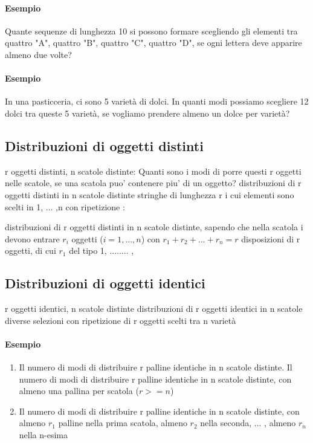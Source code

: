 \paragraph{Esempio} %
Quante sequenze di lunghezza 10 si possono formare scegliendo gli elementi tra
quattro "A",
quattro "B",
quattro "C",
quattro "D",
se ogni lettera deve apparire almeno due volte?

\paragraph{Esempio} %
In una pasticceria, ci sono 5 varietà di dolci. In quanti modi possiamo scegliere 12
dolci tra queste 5 varietà, se vogliamo prendere almeno un dolce per varietà?

\subsection{Distribuzioni di oggetti distinti} 
r oggetti distinti, n scatole distinte: Quanti sono i modi di porre questi r oggetti nelle scatole, se
una scatola puo' contenere piu' di un oggetto?
 distribuzioni di r oggetti distinti in n scatole distinte
 stringhe di lunghezza r i cui elementi sono scelti in
{1, ... ,n} con ripetizione :

 distribuzioni di r oggetti distinti in n scatole distinte,
sapendo che nella scatola i devono entrare $r_i$ oggetti
($i=1, ... ,n$) con $r_1 + r_2 + ...+ r_n = r$
 disposizioni di r oggetti, di cui $r_1 $ del tipo 1, ........ ,

\subsection{Distribuzioni di oggetti identici}
r oggetti identici, n scatole distinte
 distribuzioni di r oggetti identici in n scatole diverse
 selezioni con ripetizione di r oggetti scelti tra n varietà

\paragraph{Esempio} %
\begin{enumerate}
    \item Il numero di modi di distribuire r palline identiche in n scatole distinte.
Il numero di modi di distribuire r palline identiche in n scatole distinte,
con almeno una pallina per scatola ($r>=n$)
    \item Il numero di modi di distribuire r palline identiche in n scatole distinte,
con almeno $r_1$ palline nella prima scatola, almeno $r_2$ nella seconda, ... ,
almeno $r_n$ nella n-esima
\end{enumerate}

